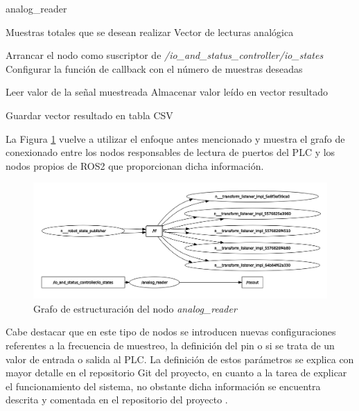 \begin{algorithm}[h!]
\caption{analog\_reader}\label{alg:algoritmo_analog_reader}
\begin{algorithmic}[1]
\Require Muestras totales que se desean realizar
\Ensure Vector de lecturas analógica

\State Arrancar el nodo como suscriptor de \textit{/io\_and\_status\_controller/io\_states}
\State Configurar la función de callback con el número de muestras deseadas

    \State Leer valor de la señal muestreada
    \State Almacenar valor leído en vector resultado
\EndWhile

\State Guardar vector resultado en tabla CSV
\end{algorithmic}
\end{algorithm}

La Figura \ref{fig:nodo analog_reader rqt_graph} vuelve a utilizar el enfoque antes mencionado y muestra el grafo de conexionado entre los nodos responsables de lectura de puertos del \acrshort{PLC} y los nodos propios de ROS2 que proporcionan dicha información. 

\begin{figure}[h!]
    \centering
    \includegraphics[scale=0.15]{figuras/nodo analog_reader rqt_graph.png}
    \caption{Grafo de estructuración del nodo \textit{analog\_reader}}
    \label{fig:nodo analog_reader rqt_graph}
\end{figure}

Cabe destacar que en este tipo de nodos se introducen nuevas configuraciones referentes a la frecuencia de muestreo, la definición del pin o si se trata de un valor de entrada o salida al \acrshort{PLC}. La definición de estos parámetros se explica con mayor detalle en el repositorio Git del proyecto\cite{repo_github_TFM_MiguelLerinAlonso}, en cuanto a la tarea de explicar el funcionamiento del sistema, no obstante dicha información se encuentra descrita y comentada en el repositorio del proyecto \cite{repo_github_TFM_MiguelLerinAlonso}.

